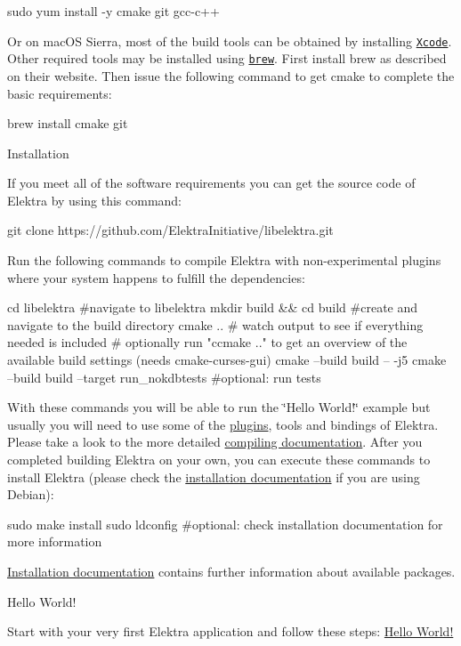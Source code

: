 \begin{DoxyCode}
sudo yum install -y cmake git gcc-c++
\end{DoxyCode}


Or on mac\+OS Sierra, most of the build tools can be obtained by installing \href{https://developer.apple.com/xcode/}{\tt Xcode}. Other required tools may be installed using \href{https://brew.sh/}{\tt brew}. First install brew as described on their website. Then issue the following command to get cmake to complete the basic requirements\+:


\begin{DoxyCode}
brew install cmake git
\end{DoxyCode}



\begin{DoxyItemize}
\item Installation

If you meet all of the software requirements you can get the source code of Elektra by using this command\+:
\end{DoxyItemize}


\begin{DoxyCode}
git clone https://github.com/ElektraInitiative/libelektra.git
\end{DoxyCode}


Run the following commands to compile Elektra with non-\/experimental plugins where your system happens to fulfill the dependencies\+:


\begin{DoxyCode}
cd libelektra  #navigate to libelektra
mkdir build  && cd build  #create and navigate to the build directory
cmake ..  # watch output to see if everything needed is included
#  optionally run "ccmake .." to get an overview of the available build settings (needs cmake-curses-gui)
cmake --build build -- -j5
cmake --build build --target run\_nokdbtests #optional: run tests
\end{DoxyCode}


With these commands you will be able to run the \char`\"{}\+Hello World!\char`\"{} example but usually you will need to use some of the \hyperlink{src_plugins_README_md}{plugins}, tools and bindings of Elektra. Please take a look to the more detailed \hyperlink{doc_COMPILE_md}{compiling documentation}. After you completed building Elektra on your own, you can execute these commands to install Elektra (please check the \hyperlink{doc_INSTALL_md}{installation documentation} if you are using Debian)\+:


\begin{DoxyCode}
sudo make install
sudo ldconfig #optional: check installation documentation for more information
\end{DoxyCode}


\hyperlink{doc_INSTALL_md}{Installation documentation} contains further information about available packages.


\begin{DoxyItemize}
\item Hello World!

Start with your very first Elektra application and follow these steps\+: \hyperlink{doc_tutorials_hello-elektra_md}{Hello World!} 
\end{DoxyItemize}
